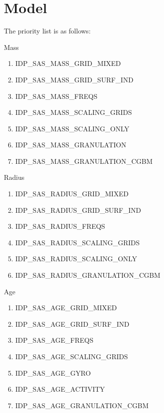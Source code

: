 \documentclass[a4paper, oneside, 11pt, article, english]{memoir}
\begin{document}
\section{Model}
\label{sec:model}

The priority list is as follows:

Mass
\begin{enumerate}
    \item IDP\_SAS\_MASS\_GRID\_MIXED
    \item IDP\_SAS\_MASS\_GRID\_SURF\_IND
    \item IDP\_SAS\_MASS\_FREQS
    \item IDP\_SAS\_MASS\_SCALING\_GRIDS
    \item IDP\_SAS\_MASS\_SCALING\_ONLY
    \item IDP\_SAS\_MASS\_GRANULATION
    \item IDP\_SAS\_MASS\_GRANULATION\_CGBM
\end{enumerate}

Radius
\begin{enumerate}
    \item IDP\_SAS\_RADIUS\_GRID\_MIXED
    \item IDP\_SAS\_RADIUS\_GRID\_SURF\_IND
    \item IDP\_SAS\_RADIUS\_FREQS
    \item IDP\_SAS\_RADIUS\_SCALING\_GRIDS
    \item IDP\_SAS\_RADIUS\_SCALING\_ONLY
    \item IDP\_SAS\_RADIUS\_GRANULATION\_CGBM
\end{enumerate}

Age
\begin{enumerate}
    \item IDP\_SAS\_AGE\_GRID\_MIXED
    \item IDP\_SAS\_AGE\_GRID\_SURF\_IND
    \item IDP\_SAS\_AGE\_FREQS
    \item IDP\_SAS\_AGE\_SCALING\_GRIDS
    \item IDP\_SAS\_AGE\_GYRO
    \item IDP\_SAS\_AGE\_ACTIVITY
    \item IDP\_SAS\_AGE\_GRANULATION\_CGBM
\end{enumerate}

    
    



\clearpage
\end{document}
